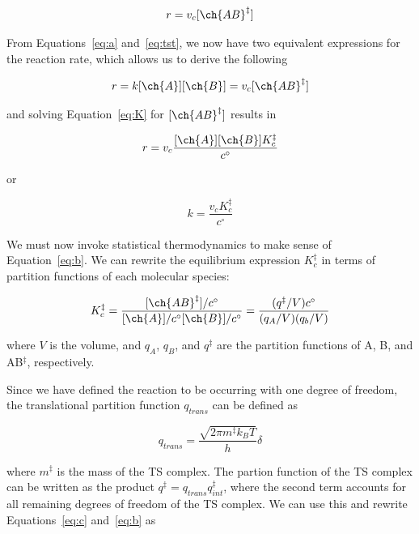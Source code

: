 \begin{doublespace}
\begin{equation}
  r = v_c [\ch{AB}^\ddagger]
\end{equation}

From Equations~\ref{eq:a} and~\ref{eq:tst}, we now have two equivalent
expressions for the reaction rate, which allows us to derive the following

\begin{equation}
  r = k[\ch{A}][\ch{B}] = v_c [\ch{AB}^\ddagger]
\end{equation}

\noindent and solving Equation~\ref{eq:K} for $[\ch{AB}^\ddagger]$ results in


\begin{equation}
  r = v_c\frac{[\ch{A}][\ch{B}]K_c^\ddagger}{c^\circ}
\end{equation}

\noindent or

\begin{equation}
  k = \frac{v_c K_c^\ddagger}{c^\circ}
\label{eq:b}
\end{equation}

We must now invoke statistical thermodynamics to make sense of
Equation~\ref{eq:b}. We can rewrite the equilibrium expression $K_c^\ddagger$ in
terms of partition functions of each molecular species:

\begin{equation}
    K_c^{\ddagger} = \frac{[\ch{AB}^\ddagger]/c^\circ}{[\ch{A}]/c^\circ[\ch{B}]/c^\circ}
    = \frac{(q^\ddagger/V)c^\circ}{(q_A/V)(q_b/V)}
\label{eq:c}
\end{equation}

\noindent where $V$ is the volume, and $q_A$, $q_B$, and $q^\ddagger$ are the
partition functions of A, B, and AB$^\ddagger$, respectively.

Since we have defined the reaction to be occurring with one degree of freedom,
the translational partition function $q_{trans}$ can be defined as

\begin{equation}
  q_{trans} = \frac{\sqrt{2\pi m^\ddagger k_B T}}{h}\delta
\end{equation}

\noindent where $m^\ddagger$ is the mass of the TS complex. The partion
function of the TS complex can be written as the product $q^\ddagger =
q_{trans}q_{int}^\ddagger$, where the second term accounts for all remaining
degrees of freedom of the TS complex. We can use this and rewrite
Equations~\ref{eq:c} and~\ref{eq:b} as


\end{doublespace}
